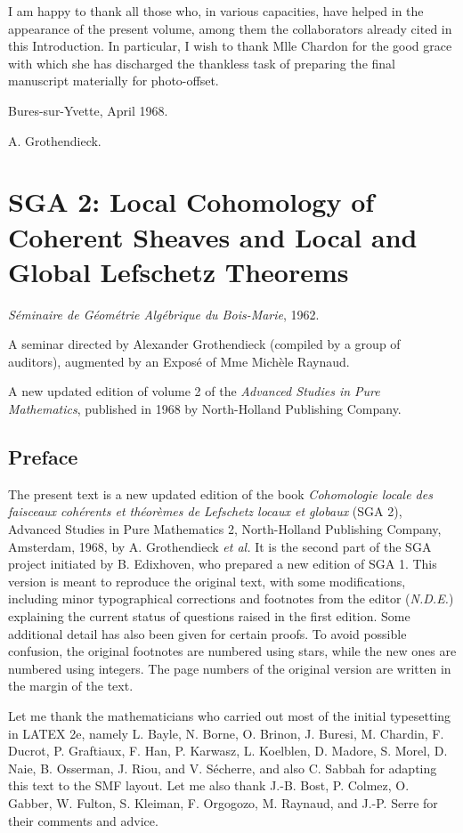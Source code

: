 \documentclass[
]{article}
\begin{document}
I am happy to thank all those who, in various capacities, have helped in
the appearance of the present volume, among them the collaborators
already cited in this Introduction. In particular, I wish to thank Mlle
Chardon for the good grace with which she has discharged the thankless
task of preparing the final manuscript materially for photo-offset.

Bures-sur-Yvette, April 1968.

A. Grothendieck.

\section{SGA 2: Local Cohomology of Coherent Sheaves and Local and
Global Lefschetz
Theorems}\label{sga-2-local-cohomology-of-coherent-sheaves-and-local-and-global-lefschetz-theorems}

\emph{Séminaire de Géométrie Algébrique du Bois-Marie}, 1962.

A seminar directed by Alexander Grothendieck (compiled by a group of
auditors), augmented by an Exposé of Mme Michèle Raynaud.

A new updated edition of volume 2 of the \emph{Advanced Studies in Pure
Mathematics}, published in 1968 by North-Holland Publishing Company.

\subsection{Preface}\label{preface}

The present text is a new updated edition of the book \emph{Cohomologie
locale des faisceaux cohérents et théorèmes de Lefschetz locaux et
globaux} (SGA 2), Advanced Studies in Pure Mathematics 2, North-Holland
Publishing Company, Amsterdam, 1968, by A. Grothendieck \emph{et al.} It
is the second part of the SGA project initiated by B. Edixhoven, who
prepared a new edition of SGA 1. This version is meant to reproduce the
original text, with some modifications, including minor typographical
corrections and footnotes from the editor (\emph{N.D.E.}) explaining the
current status of questions raised in the first edition. Some additional
detail has also been given for certain proofs. To avoid possible
confusion, the original footnotes are numbered using stars, while the
new ones are numbered using integers. The page numbers of the original
version are written in the margin of the text.

Let me thank the mathematicians who carried out most of the initial
typesetting in LATEX 2e, namely L. Bayle, N. Borne, O. Brinon, J.
Buresi, M. Chardin, F. Ducrot, P. Graftiaux, F. Han, P. Karwasz, L.
Koelblen, D. Madore, S. Morel, D. Naie, B. Osserman, J. Riou, and V.
Sécherre, and also C. Sabbah for adapting this text to the SMF layout.
Let me also thank J.-B. Bost, P. Colmez, O. Gabber, W. Fulton, S.
Kleiman, F. Orgogozo, M. Raynaud, and J.-P. Serre for their comments and
advice.
\end{document}
